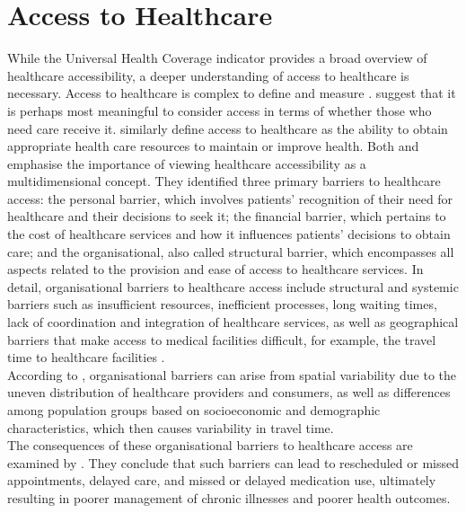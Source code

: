 \documentclass[11pt, a4paper]{report}
\begin{document}
\section{Access to Healthcare}\label{sec:introaccess}
While the Universal Health Coverage indicator provides a broad overview of healthcare accessibility, a deeper understanding of access to healthcare is necessary. Access to healthcare is complex to define and measure \citep{aday_framework_1974}. \citet{aday_framework_1974} suggest that it is perhaps most meaningful to consider access in terms of whether those who need care receive it. \citet{gulliford_what_2002} similarly define access to healthcare as the ability to obtain appropriate health care resources to maintain or improve health. Both \citet{aday_framework_1974} and \citet{gulliford_what_2002} emphasise the importance of viewing healthcare accessibility as a multidimensional concept. They identified three primary barriers to healthcare access: the personal barrier, which involves patients' recognition of their need for healthcare and their decisions to seek it; the financial barrier, which pertains to the cost of healthcare services and how it influences patients' decisions to obtain care; and the organisational, also called structural barrier, which encompasses all aspects related to the provision and ease of access to healthcare services. In detail, organisational barriers to healthcare access include structural and systemic barriers such as insufficient resources, inefficient processes, long waiting times, lack of coordination and integration of healthcare services, as well as geographical barriers that make access to medical facilities difficult, for example, the travel time to healthcare facilities \citep{carrillo_defining_2011}.\\
%
According to \citet{wang_assessing_2005}, organisational barriers can arise from spatial variability due to the uneven distribution of healthcare providers and consumers, as well as differences among population groups based on socioeconomic and demographic characteristics, which then causes variability in travel time. \\
%
The consequences of these organisational barriers to healthcare access are examined by \citet{syed_traveling_2013}. They conclude that such barriers can lead to rescheduled or missed appointments, delayed care, and missed or delayed medication use, ultimately resulting in poorer management of chronic illnesses and poorer health outcomes. 
\end{document}

